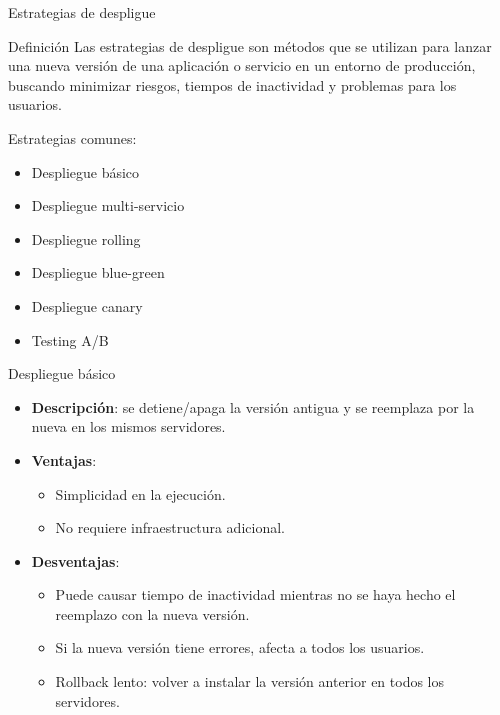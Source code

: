 \documentclass{beamer}
\begin{document}
\begin{frame}{Estrategias de despligue}

\begin{block}{Definición}
Las estrategias de despligue son métodos que se utilizan para lanzar una nueva versión de una aplicación o servicio en un entorno de producción, buscando minimizar riesgos, tiempos de inactividad y problemas para los usuarios.
\end{block}

Estrategias comunes:

\begin{itemize}
    \item Despliegue básico
    \item Despliegue multi-servicio
    \item Despliegue rolling
    \item Despliegue blue-green
    \item Despliegue canary
    \item Testing A/B
\end{itemize}
    
\end{frame}

\begin{frame}{Despliegue básico}
\begin{itemize}
    \item \textbf{Descripción}: se detiene/apaga la versión antigua y se reemplaza por la nueva en los mismos servidores.
    \item \textbf{Ventajas}:
    \begin{itemize}
        \item Simplicidad en la ejecución.
        \item No requiere infraestructura adicional.
    \end{itemize}
    \item \textbf{Desventajas}:
    \begin{itemize}
        \item Puede causar tiempo de inactividad mientras no se haya hecho el reemplazo con la nueva versión.
        \item Si la nueva versión tiene errores, afecta a todos los usuarios.
        \item Rollback lento: volver a instalar la versión anterior en todos los servidores.
    \end{itemize}
\end{itemize}
\end{frame}
\end{document}
